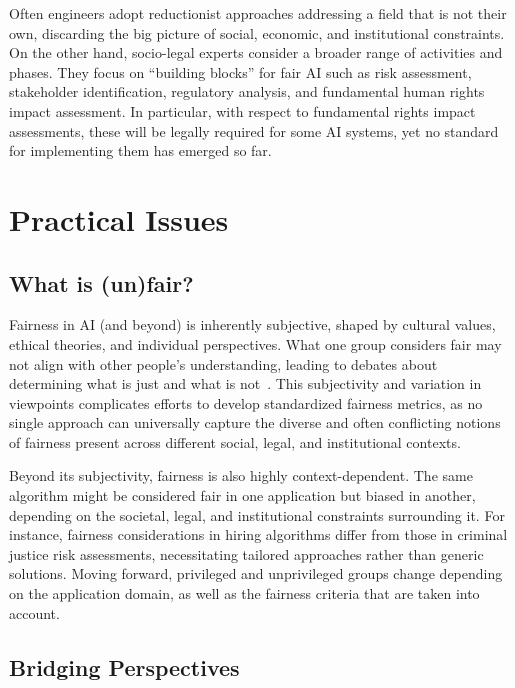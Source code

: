 \documentclass[12pt,a4paper,openright,twoside]{book}
\begin{document}
Often engineers adopt reductionist approaches addressing a field that is not their own, discarding the big picture of social, economic, and institutional constraints.
%
On the other hand, socio-legal experts consider a broader range of activities and phases.
%
They focus on ``building blocks'' for fair \ac{AI} such as risk assessment, stakeholder identification, regulatory analysis, and fundamental human rights impact assessment.
%
In particular, with respect to fundamental rights impact assessments, these will be legally required for some \ac{AI} systems, yet no standard for implementing them has emerged so far.


\section{Practical Issues}

\subsection{What is (un)fair?}


Fairness in \ac{AI} (and beyond) is inherently subjective, shaped by cultural values, ethical theories, and individual perspectives.
%
What one group considers fair may not align with other people’s understanding, leading to debates about determining what is just and what is not~\cite{ai-fairness}.
%
This subjectivity and variation in viewpoints complicates efforts to develop standardized fairness metrics, as no single approach can universally capture the diverse and often conflicting notions of fairness present across different social, legal, and institutional contexts.


Beyond its subjectivity, fairness is also highly context-dependent. 
%
The same algorithm might be considered fair in one application but biased in another, depending on the societal, legal, and institutional constraints surrounding it.
%
For instance, fairness considerations in hiring algorithms differ from those in criminal justice risk assessments, necessitating tailored approaches rather than generic solutions.
%
Moving forward, privileged and unprivileged groups change depending on the application domain, as well as the fairness criteria that are taken into account.

\subsection{Bridging Perspectives}
\end{document}
